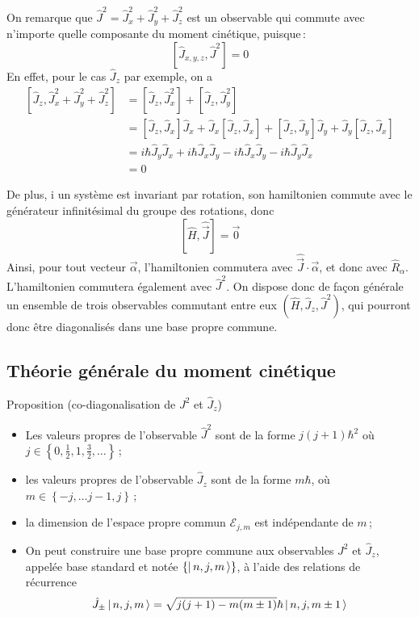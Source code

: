         On remarque que $\hat{J}^2 = \hat{J}_x^2 + \hat{J}_y^2 + \hat{J}_z^2$ est un observable qui commute avec n’importe quelle composante du moment cinétique, puisque :
\[ \left[\hat{J}_{x,y,z}, \hat{J}^2\right] = 0 \]
En effet, pour le cas $\hat{J}_z$ par exemple, on a
\begin{align*}
    \left[\hat{J}_{z}, \hat{J}_x^2 + \hat{J}_y^2 + \hat{J}_z^2\right]
     & = \left[\hat{J}_{z}, \hat{J}_x^2\right] + \left[\hat{J}_{z}, \hat{J}_y^2\right]                                                                                                         \\
     & = \left[\hat{J}_z, \hat{J}_x\right] \hat{J}_x + \hat{J}_x \left[\hat{J}_z, \hat{J}_x\right] + \left[\hat{J}_z, \hat{J}_y\right] \hat{J}_y + \hat{J}_y \left[\hat{J}_z, \hat{J}_x\right] \\
     & = i \hbar \hat{J}_y \hat{J}_x + i \hbar \hat{J}_x \hat{J}_y - i \hbar \hat{J}_x \hat{J}_y - i \hbar \hat{J}_y \hat{J}_x                                                                 \\
     & = 0
\end{align*}

        
    De plus, i un système est invariant par rotation, son hamiltonien commute avec le générateur infinitésimal du groupe des rotations, donc
    \[ \left[\hat{H}, \hat{\vec{J}}\right] = \vec{0} \]
    Ainsi, pour tout vecteur $\vec{\alpha}$, l’hamiltonien commutera avec $\hat{\vec{J}} \cdot \vec{\alpha}$, et donc avec $\hat{R}_{\alpha}$. L’hamiltonien commutera également avec $\hat{J}^2$. On dispose donc de façon générale un ensemble de trois observables commutant entre eux $(\hat{H}, \hat{J}_z, \hat{J}^2)$, qui pourront donc être diagonalisés dans une base propre commune.

\subsection{Théorie générale du moment cinétique}

\begin{omed}{Proposition (co-diagonalisation de $J^2$ et $\hat{J}_z$)}
    \begin{itemize}
        \item Les valeurs propres de l’observable $\hat{J}^2$ sont de la forme $j(j+1)\hbar^2$ où $j \in \left\{0, \frac{1}{2}, 1, \frac{3}{2}, \ldots\right\}$ ;
        \item les valeurs propres de l’observable $\hat{J}_z$ sont de la forme $m\hbar$, où $m \in \left\{-j, \ldots j-1 , j\right\}$ ;
        \item la dimension de l’espace propre commun $\mathcal{E}_{j,m}$ est indépendante de $m$ ;
        \item On peut construire une base propre commune aux observables $J^2$ et $\hat{J}_z$, appelée base standard et notée $\left\{\left| \, n,j,m \, \right>\right\}$, à l’aide des relations de récurrence
              \[ \hat{J}_{\pm} \left| \, n,j,m \, \right> = \sqrt{j(j+1) - m(m\pm1)}\hbar \left| \, n,j, m\pm1 \, \right> \]
    \end{itemize}
\end{omed}

